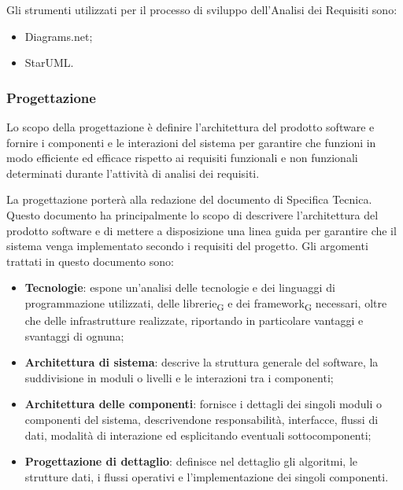 Gli strumenti utilizzati per il processo di sviluppo dell'Analisi dei Requisiti sono:
\begin{itemize}
    \item Diagrams.net;
    \item StarUML.
\end{itemize}

\subsubsection{Progettazione}
Lo scopo della progettazione è definire l'architettura del prodotto software e fornire i componenti e le interazioni del sistema per garantire che funzioni in modo efficiente ed efficace rispetto ai requisiti funzionali e non funzionali determinati durante l'attività di analisi dei requisiti.

La progettazione porterà alla redazione del documento di Specifica Tecnica. Questo documento ha principalmente lo scopo di descrivere l'architettura del prodotto software e di mettere a disposizione una linea guida per garantire che il sistema venga implementato secondo i requisiti del progetto. Gli argomenti trattati in questo documento sono:
\begin{itemize}
    \item \textbf{Tecnologie}: espone un'analisi delle tecnologie e dei linguaggi di programmazione utilizzati, delle librerie\textsubscript{G} e dei framework\textsubscript{G} necessari, oltre che delle infrastrutture realizzate, riportando in particolare vantaggi e svantaggi di ognuna;
    \item \textbf{Architettura di sistema}: descrive la struttura generale del software, la suddivisione in moduli o livelli e le interazioni tra i componenti;
    \item \textbf{Architettura delle componenti}: fornisce i dettagli dei singoli moduli o componenti del sistema, descrivendone responsabilità, interfacce, flussi di dati, modalità di interazione ed esplicitando eventuali sottocomponenti;
    \item \textbf{Progettazione di dettaglio}: definisce nel dettaglio gli algoritmi, le strutture dati, i flussi operativi e l'implementazione dei singoli componenti.
\end{itemize}

